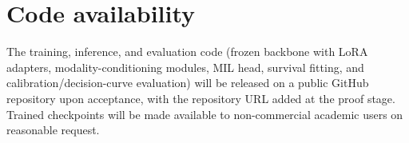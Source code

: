 \documentclass[11pt]{article}
\begin{document}
\section*{Code availability}
The training, inference, and evaluation code (frozen backbone with LoRA adapters, modality-conditioning
modules, MIL head, survival fitting, and calibration/decision-curve evaluation) will be released on a public
GitHub repository upon acceptance, with the repository URL added at the proof stage. Trained checkpoints will
be made available to non-commercial academic users on reasonable request.


\end{document}
